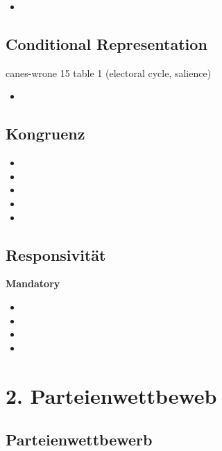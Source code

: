 \documentclass[abstract=on,parskip=full,headings=standardclasses,fontsize=11pt,paper=a4]{scrartcl}
\begin{document}
\begin{itemize}
\item {}
\end{itemize}

\subsection{Conditional Representation}

canes-wrone 15 table 1 (electoral cycle, salience)

\begin{itemize}
\item {}
\end{itemize}


\subsection{Kongruenz}

\begin{itemize}
\item {}
\item {}
\item {}
\item {}
\item {}
\end{itemize}

\subsection{Responsivität}

\textbf{Mandatory}
\begin{itemize}
\item {}
\item {}
\item {}
\item {}
\end{itemize}


\section{2. Parteienwettbeweb}

\subsection{Parteienwettbewerb}
\end{document}
